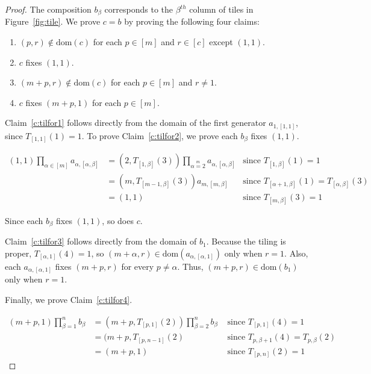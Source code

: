 \documentclass{amsart}
\newcommand{\dom}{\mathrm{dom}}
\theoremstyle{remark}
\numberwithin{equation}{section}
\begin{document}
\begin{proof}
The composition $b_\beta$ corresponds to the $\beta^{th}$ column of tiles in Figure~\ref{fig:tile}. We prove $c=b$ by proving the following four claims:

\begin{enumerate}
\item $(p,r) \not \in \dom(c)$ for each $p \in [m]$ and $r \in [c]$ except $(1,1)$. \label{c:tilfor1}
\item $c$ fixes $(1,1)$. \label{c:tilfor2}
\item $(m+p,r) \not \in \dom(c)$ for each $p \in [m]$ and $r \neq 1$. \label{c:tilfor3}
\item $c$ fixes $(m+p,1)$ for each $p \in [m]$. \label{c:tilfor4}
\end{enumerate}

Claim~\ref{c:tilfor1} follows directly from the domain of the first generator $a_{1,[1,1]}$, since $T_{[1,1]}(1) = 1$. To prove Claim~\ref{c:tilfor2}, we prove each $b_\beta$ fixes $(1,1)$.

\begin{align*}
(1,1) \prod \limits_{\alpha \in [m]} a_{\alpha,[\alpha,\beta]} &= (2,T_{[1,\beta]}(3)) \prod \limits_{\alpha=2} \limits^m a_{\alpha,[\alpha,\beta]} &\text{since }T_{[1,\beta]}(1) = 1 \\
&= (m,T_{[m-1,\beta]}(3)) a_{m,[m,\beta]} &\text{since }T_{[\alpha+1,\beta]}(1) = T_{[\alpha,\beta]}(3) \\
&= (1,1) &\text{since }T_{[m,\beta]}(3) = 1
\end{align*}

Since each $b_\beta$ fixes $(1,1)$, so does $c$.

Claim~\ref{c:tilfor3} follows directly from the domain of $b_1$. Because the tiling is proper, $T_{[\alpha,1]}(4) = 1$, so $(m+\alpha,r) \in \dom(a_{\alpha,[\alpha,1]})$ only when $r = 1$.  Also, each $a_{\alpha,[\alpha,1]}$ fixes $(m+p,r)$ for every $p\neq \alpha$. Thus, $(m+p,r) \in \dom(b_1)$ only when $r=1$.

Finally, we prove Claim~\ref{c:tilfor4}.

\begin{align*}
(m+p,1) \prod \limits_{\beta=1}^n b_\beta &= (m+p,T_{[p,1]}(2)) \prod \limits_{\beta=2}^n b_\beta &\text{ since } T_{[p,1]}(4) = 1 \\
&= (m+p,T_{[p,n-1]}(2) &\text{ since } T_{p,\beta+1}(4) = T_{p,\beta}(2) \\
&= (m+p,1) &\text{ since } T_{[p,n]}(2) = 1
\end{align*}


\end{proof}
\end{document}
